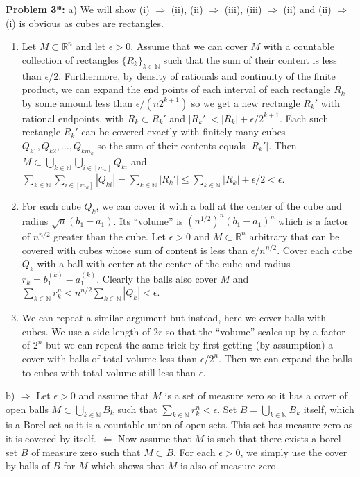 \documentclass[12pt]{amsart} %
\newcommand\N{\ensuremath{\mathbb{N}}}
\newcommand\R{\ensuremath{\mathbb{R}}}
\def\N{\mathbb{N}}
\def\R{\mathbb{R}}
\begin{document}
\bigskip
\noindent
\textbf{Problem 3*:} a) We will show (i) $\Rightarrow$ (ii), (ii) $\Rightarrow$ (iii), (iii) $\Rightarrow$ (ii) and (ii) $\Rightarrow$ (i) is obvious as cubes are rectangles. 
\begin{enumerate}
	\item Let $M \subset \R^n$ and let $\epsilon > 0$. Assume that we can cover $M$ with a countable collection of rectangles $\{R_k\}_{k \in \N} $ such that the sum of their content is less than $\epsilon/2$. Furthermore, by density of rationals and continuity of the finite product, we can expand the end points of each interval of each rectangle $R_k$ by some amount less than $\epsilon/(n 2^{k+1})$ so we get a new rectangle $R_k'$ with rational endpoints, with  $R_k \subset R_k'$ and $|R_k'| < |R_k| + \epsilon/2^{k+1}$. Each such rectangle $R_k'$ can be covered exactly with finitely many cubes  $Q_{k1}, Q_{k2}, \ldots, Q_{km_k}$ so the sum of their contents equals $|R_k'|$. Then $M \subset \bigcup_{k \in \N} \bigcup_{i \in [m_k]} Q_{ki}$ and $ \sum_{k \in \N} \sum_{i \in [m_k]} |Q_{ki}| = \sum_{k \in \N} |R_k'| \leq \sum_{k \in \N} |R_k| + \epsilon/2 < \epsilon$.
\item For each cube $Q_k$, we can cover it with a ball at the center of the cube and radius  $\sqrt{n}(b_1 - a_1)$. Its ``volume'' is $(n^{1/2})^n (b_1 - a_1)^n$ which is a factor of $n^{n/2}$ greater than the cube. Let $\epsilon > 0$ and $M \subset \R^n$ arbitrary that can be covered with cubes whose sum of content is less than $\epsilon/n^{n/2}$. Cover each cube $Q_k$ with a ball with center at the center of the cube and radius $r_k = b_1^{(k)} - a_1^{(k)}$. Clearly the balls also cover $M$ and $\sum_{k \in \N} r_k^n < n^{n/2} \sum_{k \in \N} |Q_k| < \epsilon$.
\item We can repeat a similar argument but instead, here we cover balls with cubes. We use a side length of $2r$ so that the ``volume'' scales up by a factor of  $2^n$ but we can repeat the same trick by first getting (by assumption) a cover with balls of total volume less than  $\epsilon/2^n$. Then we can expand the balls to cubes with total volume still less than $\epsilon$. 

\end{enumerate}
 

\smallskip
b) $\Rightarrow$ Let $\epsilon > 0$ and assume that $M$ is a set of measure zero so it has a cover of open balls  $M \subset \bigcup_{k \in \N} B_k$ such that $\sum_{k \in \N}r_k^n < \epsilon$. Set $B = \bigcup_{k \in \N}B_k$ itself, which is a Borel set as it is a countable union of open sets. This set has measure zero as it is covered by itself. $\Leftarrow$ Now assume that $M$ is such that there exists a borel set $B$ of measure zero such that  $M \subset B$. For each $\epsilon > 0$, we simply use the cover by balls of $B$ for $M$ which shows that  $M$ is also of measure zero.\\ 
\end{document}
